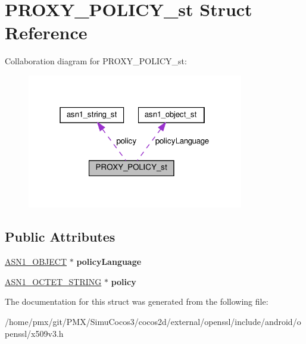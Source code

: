 \hypertarget{structPROXY__POLICY__st}{}\section{P\+R\+O\+X\+Y\+\_\+\+P\+O\+L\+I\+C\+Y\+\_\+st Struct Reference}
\label{structPROXY__POLICY__st}


Collaboration diagram for P\+R\+O\+X\+Y\+\_\+\+P\+O\+L\+I\+C\+Y\+\_\+st\+:
\nopagebreak
\begin{figure}[H]
\begin{center}
\leavevmode
\includegraphics[width=268pt]{structPROXY__POLICY__st__coll__graph}
\end{center}
\end{figure}
\subsection*{Public Attributes}
\begin{DoxyCompactItemize}
\item 
\mbox{\label{structPROXY__POLICY__st_ad95425421cb9e6dbc232c943fdbb5b6a}} 
\hyperlink{structasn1__object__st}{A\+S\+N1\+\_\+\+O\+B\+J\+E\+CT} $\ast$ {\bfseries policy\+Language}
\item 
\mbox{\label{structPROXY__POLICY__st_ab8770d14db7f03632ab34bfc71ffef50}} 
\hyperlink{structasn1__string__st}{A\+S\+N1\+\_\+\+O\+C\+T\+E\+T\+\_\+\+S\+T\+R\+I\+NG} $\ast$ {\bfseries policy}
\end{DoxyCompactItemize}


The documentation for this struct was generated from the following file\+:\begin{DoxyCompactItemize}
\item 
/home/pmx/git/\+P\+M\+X/\+Simu\+Cocos3/cocos2d/external/openssl/include/android/openssl/x509v3.\+h\end{DoxyCompactItemize}
